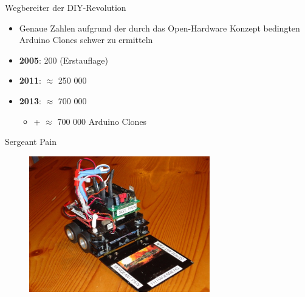 \documentclass{beamer}
\begin{document}
\begin{frame}{Wegbereiter der DIY-Revolution}
\begin{itemize}
	\item Genaue Zahlen aufgrund der durch das Open-Hardware Konzept bedingten Arduino Clones schwer zu ermitteln
\end{itemize}
\vspace{10px}
\begin{itemize}
	\item \textbf{2005}: 200 (Erstauflage)\cite{IEEE:2016:TheMakingOfArduino}
\end{itemize}
\begin{itemize}
	\item \textbf{2011}: $\approx$ 250 000\cite{IEEE:2016:TheMakingOfArduino}
\end{itemize}
\begin{itemize}
	\item \textbf{2013}: $\approx$ 700 000\cite{Quora:ArduinoSalesNumbers}
	\begin{itemize}
		\item + $\approx$ 700 000 Arduino Clones
	\end{itemize}
\end{itemize}
\end{frame}
\begin{frame}{Sergeant Pain}
 \begin{figure}[H]
  \centering
  \includegraphics[width=0.7\textwidth]{./images/robot-sergeant-pain.jpg}
 \end{figure}
\end{frame}
\end{document}
